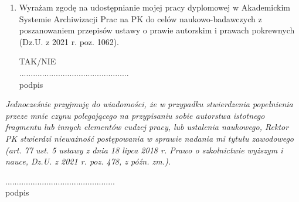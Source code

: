 \begin{footnotesize}
\begin{enumerate}
    \item Wyrażam zgodę na udostępnianie mojej pracy dyplomowej w Akademickim
    Systemie Archiwizacji Prac na PK do celów naukowo-badawczych z poszanowaniem
    przepisów ustawy o prawie autorskim i prawach pokrewnych (Dz.U. z 2021 r.
    poz. 1062).

    \begin{flushright}
    TAK/NIE\\
    ................................................\\
    podpis
    \end{flushright}
\end{enumerate}

\textit{Jednocześnie przyjmuję do wiadomości, że w przypadku stwierdzenia
popełnienia przeze mnie czynu polegającego na przypisaniu sobie autorstwa
istotnego fragmentu lub innych elementów cudzej pracy, lub ustalenia naukowego,
Rektor PK stwierdzi nieważność postępowania w sprawie nadania mi tytułu
zawodowego (art. 77 ust. 5 ustawy z dnia 18 lipca 2018 r. Prawo o szkolnictwie
wyższym i nauce, Dz.U. z 2021 r. poz. 478, z późn. zm.).}

\begin{flushright}
................................................\\
podpis
\end{flushright}
\end{footnotesize}
\clearpage
\endgroup

